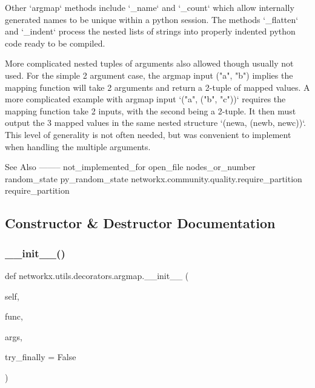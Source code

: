 \begin{DoxyVerb}
Other `argmap` methods include `_name` and `_count` which allow internally
generated names to be unique within a python session.
The methods `_flatten` and `_indent` process the nested lists of strings
into properly indented python code ready to be compiled.

More complicated nested tuples of arguments also allowed though
usually not used. For the simple 2 argument case, the argmap
input ("a", "b") implies the mapping function will take 2 arguments
and return a 2-tuple of mapped values. A more complicated example
with argmap input `("a", ("b", "c"))` requires the mapping function
take 2 inputs, with the second being a 2-tuple. It then must output
the 3 mapped values in the same nested structure `(newa, (newb, newc))`.
This level of generality is not often needed, but was convenient
to implement when handling the multiple arguments.

See Also
--------
not_implemented_for
open_file
nodes_or_number
random_state
py_random_state
networkx.community.quality.require_partition
require_partition\end{DoxyVerb}
 

\subsection{Constructor \& Destructor Documentation}
\mbox{\label{classnetworkx_1_1utils_1_1decorators_1_1argmap_a8b280ba089372013289dbd0fb23e4c5d}} 
\subsubsection{\texorpdfstring{\+\_\+\+\_\+init\+\_\+\+\_\+()}{\_\_init\_\_()}}
{\footnotesize\ttfamily def networkx.\+utils.\+decorators.\+argmap.\+\_\+\+\_\+init\+\_\+\+\_\+ (\begin{DoxyParamCaption}\item[{}]{self,  }\item[{}]{func,  }\item[{}]{args,  }\item[{}]{try\+\_\+finally = {\ttfamily False} }\end{DoxyParamCaption})}



